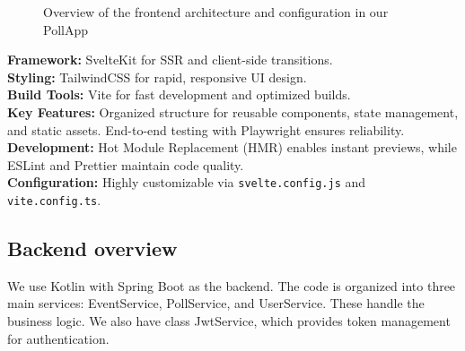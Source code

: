 \begin{figure}[H]
{
}
\caption{Overview of the frontend architecture and configuration in our PollApp}
\label{fig:frontend_overview_with_configuration}
\end{figure}



\noindent \textbf{Framework:} SvelteKit for SSR and client-side transitions. \\
\noindent \textbf{Styling:} TailwindCSS for rapid, responsive UI design. \\
\noindent \textbf{Build Tools:} Vite for fast development and optimized builds. \\
\noindent \textbf{Key Features:} Organized structure for reusable components, state management, and static assets. End-to-end testing with Playwright ensures reliability. \\
\noindent \textbf{Development:} Hot Module Replacement (HMR) enables instant previews, while ESLint and Prettier maintain code quality. \\
\noindent  \textbf{Configuration:} Highly customizable via \texttt{svelte.config.js} and \texttt{vite.config.ts}.


\subsection{Backend overview}
We use Kotlin with Spring Boot as the backend. The code is organized into three main services: EventService, PollService, and UserService. These handle the business logic. We also have class JwtService,  which provides token management for authentication.
 
